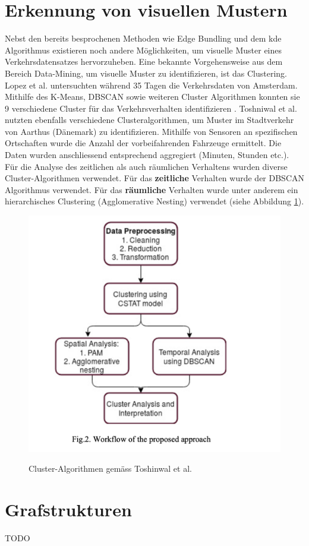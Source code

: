 \section{Erkennung von visuellen Mustern}
Nebst den bereits besprochenen Methoden wie Edge Bundling und dem \acrshort{kde} Algorithmus existieren noch andere Möglichkeiten, um visuelle Muster eines Verkehrsdatensatzes hervorzuheben. Eine bekannte Vorgehensweise aus dem Bereich Data-Mining, um visuelle Muster zu identifizieren, ist das Clustering. Lopez et al. untersuchten während 35 Tagen die Verkehrsdaten von Amsterdam. Mithilfe des K-Means, DBSCAN sowie weiteren Cluster Algorithmen konnten sie 9 verschiedene Cluster für das Verkehrsverhalten identifizieren \parencite{lopez_2017}. Toshniwal et al. nutzten ebenfalls verschiedene Clusteralgorithmen, um Muster im Stadtverkehr von Aarthus (Dänemark) zu identifizieren. Mithilfe von Sensoren an spezifischen Ortschaften wurde die Anzahl der vorbeifahrenden Fahrzeuge ermittelt. Die Daten wurden anschliessend entsprechend aggregiert (Minuten, Stunden etc.). Für die Analyse des zeitlichen als auch räumlichen Verhaltens wurden diverse Cluster-Algorithmen verwendet. Für das \textbf{zeitliche} Verhalten wurde der DBSCAN Algorithmus verwendet. Für das \textbf{räumliche} Verhalten wurde unter anderem ein hierarchisches Clustering (Agglomerative Nesting) verwendet (siehe Abbildung \ref{fig_clustering_urban_traffic}).

\begin{figure}[H]
    \caption{Cluster-Algorithmen gemäss Toshinwal et al. \parencite[S. 1050]{clustering_urban_traffic_data}}
    \includegraphics[width=.5\linewidth]{content/00_assets/urban_traffic_clustering_methods.png}
    \label{fig_clustering_urban_traffic}
\end{figure}

\section{Grafstrukturen}
TODO


